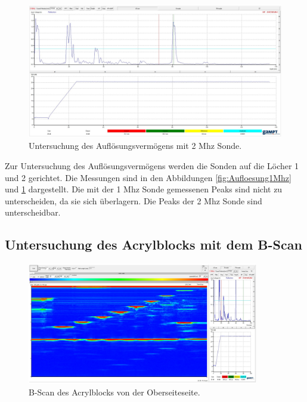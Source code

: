\begin{figure}[H]
    \centering
    \includegraphics[width=\textwidth]{img/Aufloesung_2Mhz.png}
    \caption{Untersuchung des Auflösungsvermögens mit 2 Mhz Sonde.}
    \label{fig:Aufloesung2Mhz}
\end{figure}

Zur Untersuchung des Auflösungsvermögens werden die Sonden auf die Löcher 1 und 2 gerichtet.
Die Messungen sind in den Abbildungen \ref{fig:Aufloesung1Mhz} und \ref{fig:Aufloesung2Mhz} dargestellt.
Die mit der 1 Mhz Sonde gemessenen Peaks sind nicht zu unterscheiden, da sie sich überlagern.
Die Peaks der 2 Mhz Sonde sind unterscheidbar. 


\subsection{Untersuchung des Acrylblocks mit dem B-Scan}
\label{sec:BScanAcryl}

\begin{figure}
    \centering
    \includegraphics[width=0.9\textwidth]{img/b-scan2.png}
    \caption{B-Scan des Acrylblocks von der Oberseiteseite.}
    \label{fig:BScanSeiteOben}
\end{figure}


